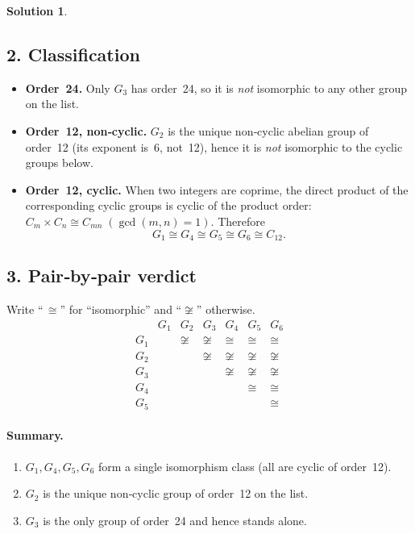 \documentclass[12pt]{article}
\theoremstyle{definition} %
\newtheorem{solution}{Solution}
\theoremstyle{plain} %
\begin{document}
\begin{solution}
  \subsection*{2.\;  Classification}
  \begin{itemize}
    \item \textbf{Order~24.}\; Only \(G_3\) has order 24, so it is
          \emph{not} isomorphic to any other group on the list.
  
    \item \textbf{Order~12, non‑cyclic.}\;
          \(G_2\) is the unique non‑cyclic abelian group of order 12
          (its exponent is~6, not~12), hence it is
          \emph{not} isomorphic to the cyclic groups below.
  
    \item \textbf{Order~12, cyclic.}\;
          When two integers are coprime, the direct product of the
          corresponding cyclic groups is cyclic of the product order:
          \(
            C_m\times C_n\cong C_{mn}\;(\gcd(m,n)=1).
          \)
          Therefore
          \[
            G_1\cong G_4\cong G_5\cong G_6\cong C_{12}.
          \]
  \end{itemize}
  
  \subsection*{3.\;  Pair‑by‑pair verdict}
  Write “\,\(\cong\)” for “isomorphic” and “\(\not\cong\)” otherwise.
  \[
  \begin{array}{c|cccccc}
          & G_1 & G_2 & G_3 & G_4 & G_5 & G_6\\\hline
    G_1   &      & \not\cong & \not\cong & \cong & \cong & \cong\\
    G_2   &      &           & \not\cong & \not\cong & \not\cong & \not\cong\\
    G_3   &      &           &           & \not\cong & \not\cong & \not\cong\\
    G_4   &      &           &           &          & \cong & \cong\\
    G_5   &      &           &           &          &        & \cong
  \end{array}
  \]
  
  \paragraph{Summary.}
  \begin{enumerate}[label=\alph*)]
    \item \(G_1,G_4,G_5,G_6\) form a single isomorphism class (all are cyclic of order 12).
    \item \(G_2\) is the unique non‑cyclic group of order 12 on the list.
    \item \(G_3\) is the only group of order 24 and hence stands alone.
  \end{enumerate}
  \end{solution}%
\end{document}
